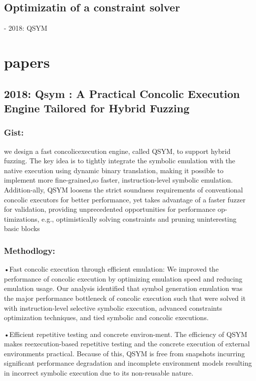 \documentclass[	runningheads,
				a4paper]{llncs}
\begin{document}

\subsection{Optimizatin of a constraint solver}
- 2018: QSYM






\section{papers}


\subsection{2018: Qsym : A Practical Concolic Execution Engine Tailored for Hybrid Fuzzing}
\subsubsection{Gist:}
we design a fast concolicexecution engine, called QSYM, to support hybrid fuzzing. The key idea is to tightly integrate the symbolic emulation with the native execution using dynamic binary translation, making it possible to implement more fine-grained,so faster, instruction-level symbolic emulation. Addition-ally, QSYM loosens the strict soundness requirements of conventional concolic executors for better performance, yet takes advantage of a faster fuzzer for validation, providing unprecedented opportunities for performance op-timizations, e.g., optimistically solving constraints and pruning uninteresting basic blocks

\subsubsection{Methodlogy:}
•Fast concolic execution through efficient emulation:
We  improved  the  performance  of  concolic execution by optimizing emulation speed and reducing emulation usage.  Our analysis identified that symbol generation emulation was the major performance bottleneck of concolic execution such that were solved it with instruction-level selective symbolic execution, advanced constraints optimization techniques, and tied symbolic and concolic executions.

•Efficient repetitive testing and concrete environ-ment. The efficiency of QSYM makes reexecution-based repetitive testing and the concrete execution of external environments practical. Because of this, QSYM is free from snapshots incurring significant performance degradation and incomplete environment models resulting in incorrect symbolic execution due to its non-reusable nature.
\end{document}
